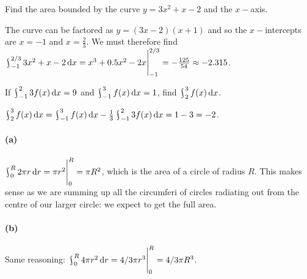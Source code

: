 \documentclass[answers]{exam}
\theoremstyle{definition}
\theoremstyle{break}
\DeclareMathOperator*{\rint}{\scalerel*{\rotatebox{17}{$\!\int\!$}}{\int}}
\begin{document}
\begin{questions}
  \question[2] Find the area bounded by the curve $ y = 3x^2 + x - 2 $ and the $ x-$axis.
  \begin{solution}
    The curve can be factored as $ y = (3x - 2)(x + 1) $ and so the $ x-$intercepts are $ x = -1 $ and $ x = \frac{2}{3} $.
    We must therefore find $ \rint^{2/3}_{-1} 3x^2 + x - 2 \dif{x} = \eval{x^3 + 0.5x^2 - 2x}^{2/3}_{-1} = -\frac{125}{54} \approx -2.315 $.
  \end{solution}

  \question[2] If $ \rint^2_{-1} 3f(x) \dif{x} = 9 $ and $ \rint_{-1}^{3} f(x) \dif{x} = 1 $, find $ \rint_2^3 f(x) \dif{x} $.
  \begin{solution}
    $ \rint_2^3 f(x) \dif{x} = \rint_{-1}^{3} f(x) \dif{x} - \frac{1}{3} \rint^2_{-1} 3f(x) \dif{x} = 1 - 3 = -2 $.
  \end{solution}

  \question
  \begin{solution}
    \paragraph{(a)}
    $ \rint_0^R 2\pi r \dif{r} = \eval{\pi r^2}_0^R = \pi R^2 $, which is the area of a circle of radius $ R $. This makes sense as we
    are summing up all the circumferi of circles radiating out from the centre of our larger circle: we expect to get the full area.
    \paragraph{(b)} Same reasoning: $ \rint^R_0 4\pi r^2 \dif{r} = \eval{4/3 \pi r^3}_0^R = 4/3 \pi R^3 $.
  \end{solution}


\end{questions}
\end{document}
